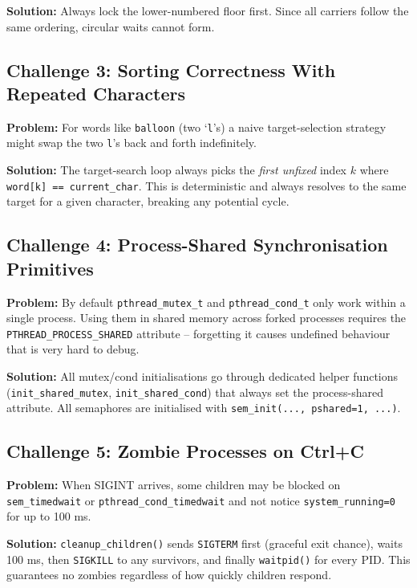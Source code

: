 \documentclass[12pt,a4paper]{article}
\newcommand{\code}[1]{\texttt{\small #1}}
\begin{document}
\textbf{Solution:} Always lock the lower-numbered floor first. Since all carriers
follow the same ordering, circular waits cannot form.

\subsection{Challenge 3: Sorting Correctness With Repeated Characters}

\textbf{Problem:} For words like \texttt{balloon} (two `\texttt{l}'s) a naive
target-selection strategy might swap the two \texttt{l}'s back and forth
indefinitely.

\textbf{Solution:} The target-search loop always picks the \emph{first unfixed}
index $k$ where \code{word[k] == current\_char}. This is deterministic and always
resolves to the same target for a given character, breaking any potential cycle.

\subsection{Challenge 4: Process-Shared Synchronisation Primitives}

\textbf{Problem:} By default \code{pthread\_mutex\_t} and \code{pthread\_cond\_t}
only work within a single process. Using them in shared memory across forked
processes requires the \code{PTHREAD\_PROCESS\_SHARED} attribute -- forgetting it
causes undefined behaviour that is very hard to debug.

\textbf{Solution:} All mutex/cond initialisations go through dedicated helper
functions (\code{init\_shared\_mutex}, \code{init\_shared\_cond}) that always
set the process-shared attribute. All semaphores are initialised with
\code{sem\_init(..., pshared=1, ...)}.

\subsection{Challenge 5: Zombie Processes on Ctrl+C}

\textbf{Problem:} When SIGINT arrives, some children may be blocked on
\code{sem\_timedwait} or \code{pthread\_cond\_timedwait} and not notice
\code{system\_running=0} for up to 100 ms.

\textbf{Solution:} \code{cleanup\_children()} sends \code{SIGTERM} first (graceful
exit chance), waits 100 ms, then \code{SIGKILL} to any survivors, and finally
\code{waitpid()} for every PID. This guarantees no zombies regardless of how
quickly children respond.
\end{document}
